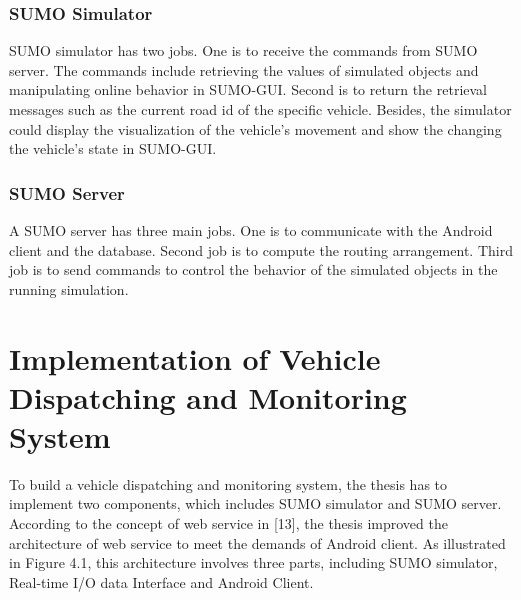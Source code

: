 \documentclass[12pt]{ksthesis}
\begin{document}
\begin{thesis}
{\subsection{SUMO Simulator}
SUMO simulator has two jobs. One is to receive the commands from SUMO server. The commands include retrieving the values of simulated objects and manipulating online behavior in SUMO-GUI. Second is to return the retrieval messages such as the current road id of the specific vehicle. Besides, the simulator could display the visualization of the vehicle’s movement and show the changing the vehicle’s state in SUMO-GUI.

\subsection{SUMO Server}
A SUMO server has three main jobs. One is to communicate with the Android client and the database. Second job is to compute the routing arrangement. Third job is to send commands to control the behavior of the simulated objects in the running simulation.

\chapter{Implementation of Vehicle Dispatching and Monitoring System }\label{Chap:Architecture}

To build a vehicle dispatching and monitoring system, the thesis has to implement two components, which includes SUMO simulator and SUMO server. According to the concept of web service in [13], the thesis improved the architecture of web service to meet the demands of Android client.
As illustrated in Figure 4.1, this architecture involves three parts, including SUMO simulator, Real-time I/O data Interface and Android Client.

}
\end{thesis}
\end{document}
